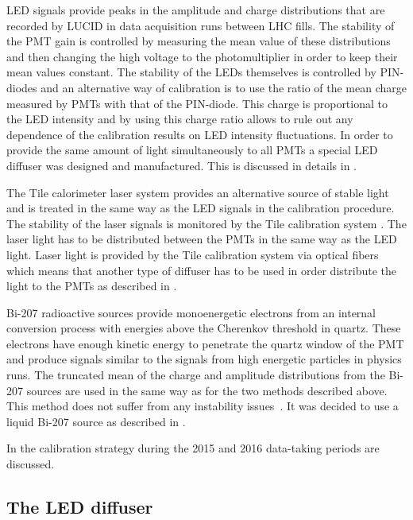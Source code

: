 LED signals provide peaks in the amplitude and charge distributions that are recorded by LUCID in data acquisition runs between LHC fills.
The stability of the PMT gain is controlled by measuring the mean value of these distributions 
and then changing the high voltage to the photomultiplier in order to keep their mean values constant. 
The stability of the LEDs themselves is controlled by PIN-diodes and an alternative way of calibration is 
to use the ratio of the mean charge measured by PMTs with that of the PIN-diode. 
This charge is proportional to the LED intensity and by using this charge ratio allows to rule out any 
dependence of the calibration results on LED intensity fluctuations.
In order to provide the same amount of light simultaneously to all PMTs a special LED diffuser was designed and manufactured.
This is discussed in details in .

The Tile calorimeter laser system provides an alternative source of stable light and is treated in the same way
as the LED signals in the calibration procedure. 
The stability of the laser signals is monitored by the Tile calibration system \cite{Aad:2008zzm}.
The laser light has to be distributed between the PMTs in the same way as the LED light.
Laser light is provided by the Tile calibration system via optical fibers which means that another type of diffuser
has to be used in order distribute the light to the PMTs as described in .

Bi-207 radioactive sources provide monoenergetic electrons from an internal conversion process with energies 
above the Cherenkov threshold in quartz. These electrons
have enough kinetic energy to penetrate the quartz window of the PMT and produce signals similar to the signals 
from high energetic particles in physics runs. The truncated mean of the charge and amplitude 
distributions from the Bi-207 sources are used in the same way as for the two methods described above. 
This method does not suffer from any instability issues~\cite{Alberghi:2016tad}.
It was decided to use a liquid Bi-207 source as described in .

In  the calibration strategy during the  2015 and 2016 data-taking periods are discussed.

\subsection{The LED diffuser}
\label{subsec:LEDDiffuser}


